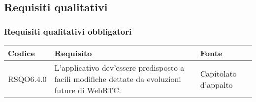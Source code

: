 \subsection{Requisiti qualitativi}

\subsubsection{Requisiti qualitativi obbligatori}

\begin{center}
\begin{longtable}{lp{}l}
\toprule Codice & Requisito & Fonte\\
\midrule
RSQO6.4.0 & L'applicativo dev'essere predisposto a facili modifiche dettate da evoluzioni future di WebRTC. & Capitolato d'appalto \\
\bottomrule
\end{longtable}
\end{center}

